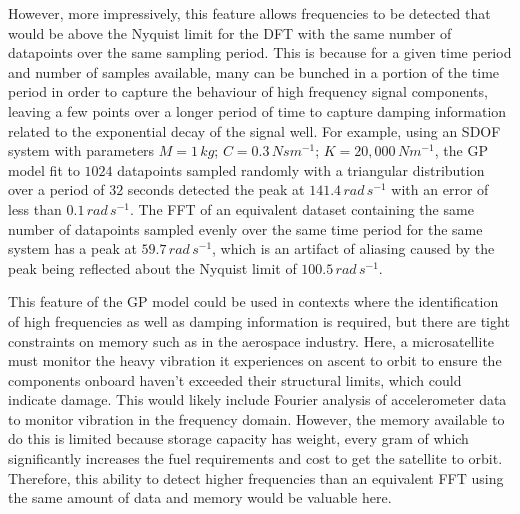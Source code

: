 \documentclass[12pt]{article}
\begin{document}
    However, more impressively, this feature allows frequencies to be detected that would be above the Nyquist limit for the DFT with the same number of datapoints over the same sampling period.
    This is because for a given time period and number of samples available, many can be bunched in a portion of the time period in order to capture the behaviour of high frequency signal components, leaving a few points over a longer period of time to capture damping information related to the exponential decay of the signal well.
    For example, using an SDOF system with parameters $M = 1 \, kg$; $C = 0.3 \, Nsm^{-1}$; $K = 20,000 \, Nm^{-1}$, the GP model fit to $1024$ datapoints sampled randomly with a triangular distribution over a period of $32$ seconds detected the peak at $141.4 \, rad \, s^{-1}$ with an error of less than $0.1 \, rad \, s^{-1}$.
    The FFT of an equivalent dataset containing the same number of datapoints sampled evenly over the same time period for the same system has a peak at $59.7 \, rad \, s^{-1}$, which is an artifact of aliasing caused by the peak being reflected about the Nyquist limit of $100.5 \, rad \, s^{-1}$.

    This feature of the GP model could be used in contexts where the identification of high frequencies as well as damping information is required, but there are tight constraints on memory such as in the aerospace industry.
    Here, a microsatellite must monitor the heavy vibration it experiences on ascent to orbit to ensure the components onboard haven't exceeded their structural limits, which could indicate damage.
    This would likely include Fourier analysis of accelerometer data to monitor vibration in the frequency domain.
    However, the memory available to do this is limited because storage capacity has weight, every gram of which significantly increases the fuel requirements and cost to get the satellite to orbit.
    Therefore, this ability to detect higher frequencies than an equivalent FFT using the same amount of data and memory would be valuable here.
\end{document}
